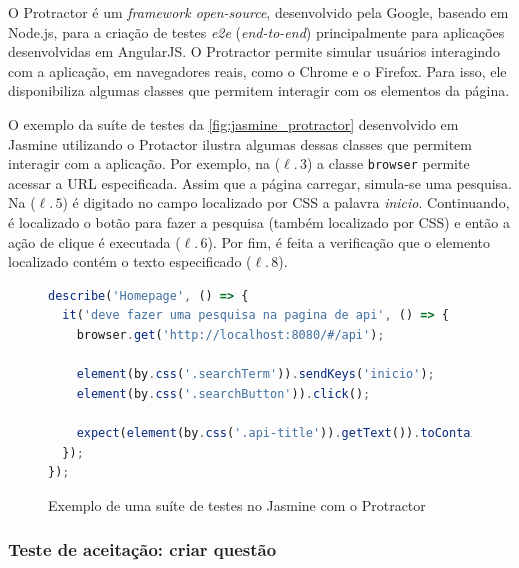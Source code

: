 O Protractor é um \textit{framework open-source}, desenvolvido pela Google, baseado em Node.js, para a criação de testes
\textit{e2e} (\textit{end-to-end})
principalmente para aplicações desenvolvidas em AngularJS. O Protractor permite simular usuários interagindo com a
aplicação, em navegadores reais, como o Chrome e o Firefox. Para isso, ele disponibiliza algumas classes
que permitem interagir com os elementos da página.

O exemplo da suíte de testes da \autoref{fig:jasmine_protractor} desenvolvido em Jasmine utilizando
o Protactor ilustra algumas dessas classes que permitem interagir com a aplicação. Por exemplo, na
($\ell.\,3$) a classe \texttt{browser} permite acessar a URL especificada. Assim que a página carregar,
simula-se uma pesquisa. Na ($\ell.\,5$) é digitado no campo localizado por CSS a palavra \textit{inicio}.
Continuando, é localizado o botão para fazer a pesquisa (também localizado por CSS) e então a ação de clique é executada ($\ell.\,6$).
Por fim, é feita a verificação que o elemento localizado contém o texto especificado ($\ell.\,8$).

\begin{figure}[!ht]
\caption{Exemplo de uma suíte de testes no Jasmine com o Protractor}
\label{fig:jasmine_protractor}
\begin{lstlisting}[language=JavaScript]
describe('Homepage', () => {
  it('deve fazer uma pesquisa na pagina de api', () => {
    browser.get('http://localhost:8080/#/api');

    element(by.css('.searchTerm')).sendKeys('inicio');
    element(by.css('.searchButton')).click();

    expect(element(by.css('.api-title')).getText()).toContain('browser.inicio');
  });
});
\end{lstlisting}
\doautor
\end{figure}

\subsubsection{Teste de aceitação: criar questão}


